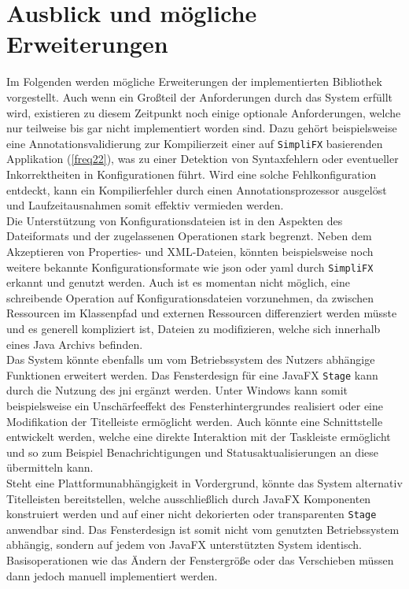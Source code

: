 \section{Ausblick und mögliche Erweiterungen}
\label{ausblick_und_mögliche_erweiterungen}
Im Folgenden werden mögliche Erweiterungen der implementierten Bibliothek vorgestellt. Auch wenn ein Großteil der Anforderungen durch das System erfüllt wird, existieren zu diesem Zeitpunkt noch einige optionale Anforderungen, welche nur teilweise bis gar nicht implementiert worden sind. Dazu gehört beispielsweise eine Annotationsvalidierung zur Kompilierzeit einer auf \texttt{SimpliFX} basierenden Applikation (\autoref{freq22}), was zu einer Detektion von Syntaxfehlern oder eventueller Inkorrektheiten in Konfigurationen führt. Wird eine solche Fehlkonfiguration entdeckt, kann ein Kompilierfehler durch einen Annotationsprozessor ausgelöst und Laufzeitausnahmen somit effektiv vermieden werden.\\
Die Unterstützung von Konfigurationsdateien ist in den Aspekten des Dateiformats und der zugelassenen Operationen stark begrenzt. Neben dem Akzeptieren von Properties- und XML-Dateien, könnten beispielsweise noch weitere bekannte Konfigurationsformate wie \ac{json} oder \ac{yaml} durch \texttt{SimpliFX} erkannt und genutzt werden. Auch ist es momentan nicht möglich, eine schreibende Operation auf Konfigurationsdateien vorzunehmen, da zwischen Ressourcen im Klassenpfad und externen Ressourcen differenziert werden müsste und es generell kompliziert ist, Dateien zu modifizieren, welche sich innerhalb eines Java Archivs befinden.\\
Das System könnte ebenfalls um vom Betriebssystem des Nutzers abhängige Funktionen erweitert werden. Das Fensterdesign für eine JavaFX \texttt{Stage} kann durch die Nutzung des \ac{jni} ergänzt werden. Unter Windows kann somit beispielsweise ein Unschärfeeffekt des Fensterhintergrundes realisiert oder eine Modifikation der Titelleiste ermöglicht werden. Auch könnte eine Schnittstelle entwickelt werden, welche eine direkte Interaktion mit der Taskleiste ermöglicht und so zum Beispiel Benachrichtigungen und Statusaktualisierungen an diese übermitteln kann.\\
Steht eine Plattformunabhängigkeit in Vordergrund, könnte das System alternativ Titelleisten bereitstellen, welche ausschließlich durch JavaFX Komponenten konstruiert werden und auf einer nicht dekorierten oder transparenten \texttt{Stage} anwendbar sind. Das Fensterdesign ist somit nicht vom genutzten Betriebssystem abhängig, sondern auf jedem von JavaFX unterstützten System identisch. Basisoperationen wie das Ändern der Fenstergröße oder das Verschieben müssen dann jedoch manuell implementiert werden.\\
